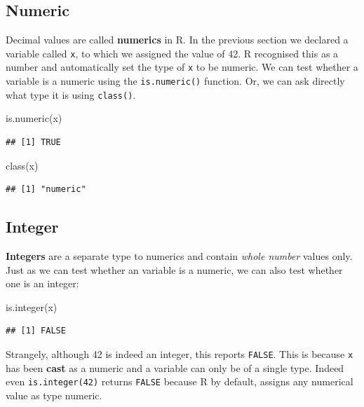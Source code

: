 \documentclass[a4paper]{book}
\newenvironment{Shaded}{}{}
\newcommand{\KeywordTok}[1]{\textcolor[rgb]{0.00,0.00,1.00}{{#1}}}
\newcommand{\NormalTok}[1]{{#1}}
\newlength{\leftbarwidth}
\newlength{\leftbarsep}
\newcommand*{\leftbarcolorcmd}{\color{darkgray}}%
\renewenvironment{leftbar}{%
    \def\FrameCommand{{\leftbarcolorcmd{\vrule width \leftbarwidth\relax\hspace {\leftbarsep}}}}%
    \MakeFramed {\advance \hsize -\width \FrameRestore }%
}{%
    \endMakeFramed
}
\renewenvironment{Shaded}
{\vspace{0em}\begin{leftbar}\begin{snugshade}}
{\end{snugshade}\end{leftbar}\vspace{0pt}}
\begin{document}
\subsection{Numeric}\label{numeric}

Decimal values are called \textbf{numerics} in R. In the previous
section we declared a variable called \texttt{x}, to which we assigned
the value of 42. R recognised this as a number and automatically set the
type of \texttt{x} to be numeric. We can test whether a variable is a
numeric using the \texttt{is.numeric()} function. Or, we can ask
directly what type it is using \texttt{class()}.

\begin{Shaded}
\begin{Highlighting}[]
\KeywordTok{is.numeric}\NormalTok{(x)}
\end{Highlighting}
\end{Shaded}

\begin{verbatim}
## [1] TRUE
\end{verbatim}

\begin{Shaded}
\begin{Highlighting}[]
\KeywordTok{class}\NormalTok{(x)}
\end{Highlighting}
\end{Shaded}

\begin{verbatim}
## [1] "numeric"
\end{verbatim}

\subsection{Integer}\label{integer}

\textbf{Integers} are a separate type to numerics and contain
\emph{whole number} values only. Just as we can test whether an variable
is a numeric, we can also test whether one is an integer:

\begin{Shaded}
\begin{Highlighting}[]
\KeywordTok{is.integer}\NormalTok{(x)}
\end{Highlighting}
\end{Shaded}

\begin{verbatim}
## [1] FALSE
\end{verbatim}

Strangely, although 42 is indeed an integer, this reports
\texttt{FALSE}. This is because \texttt{x} has been \textbf{cast} as a
numeric and a variable can only be of a single type. Indeed even
\texttt{is.integer(42)} returns \texttt{FALSE} because R by default,
assigns any numerical value as type numeric.
\end{document}
